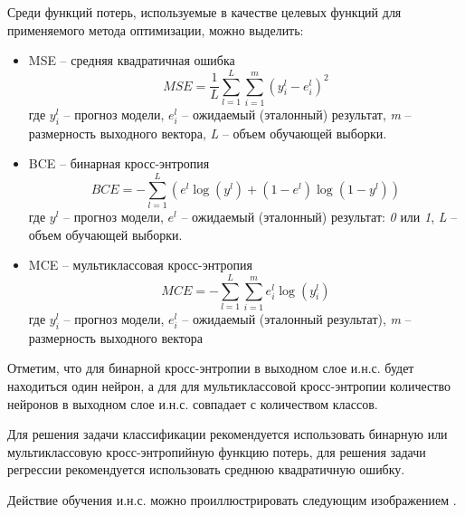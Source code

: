 Среди функций потерь, используемые в качестве целевых функций для применяемого метода оптимизации, можно выделить:

\begin{itemize}
	\item MSE -- средняя квадратичная ошибка\\
		\begin{equation*}
			MSE = \frac{1}{L} \sum_{l=1}^L \sum_{i=1}^m (y_i^l - e_i^l)^2
		\end{equation*}
		где $y_i^l$ -- прогноз модели, $e_i^l$ -- ожидаемый (эталонный) результат, \textit{m} -- размерность выходного вектора, \textit{L} -- объем обучающей выборки.

	\item BCE -- бинарная кросс-энтропия\\
	\begin{equation*}
		BCE = - \sum_{l=1}^L (e^l \log(y^l) + (1 - e^l)\log(1 - y^l))
	\end{equation*}
	где $y^l$ -- прогноз модели, $e^l$ -- ожидаемый (эталонный) результат: \textit{0} или \textit{1}, \textit{L} -- объем обучающей выборки.
	\item MCE -- мультиклассовая кросс-энтропия\\
	\begin{equation*}
		MCE = - \sum_{l=1}^L \sum_{i=1}^m e_{i}^l \log(y_{i}^l)
	\end{equation*}
	где $y_{i}^l$ -- прогноз модели, $e_i^l$ -- ожидаемый (эталонный результат), \textit{m} -- размерность выходного вектора
\end{itemize}

Отметим, что для бинарной кросс-энтропии в выходном слое и.н.с. будет находиться один нейрон, а для для мультиклассовой кросс-энтропии количество нейронов в выходном слое и.н.с. совпадает с количеством классов.

Для решения задачи классификации рекомендуется использовать бинарную или мультиклассовую кросс-энтропийную функцию потерь, для решения задачи регрессии рекомендуется использовать среднюю квадратичную ошибку.

Действие обучения и.н.с. можно проиллюстрировать следующим изображением \textit{}.

